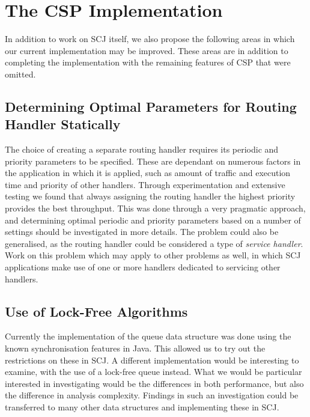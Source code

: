 

\section{The CSP Implementation} %
\label{sec:the_csp_implementation}
In addition to work on SCJ itself, we also propose the following areas in which our current implementation may be improved. These areas are in addition to completing the implementation with the remaining features of CSP that were omitted.

\subsection{Determining Optimal Parameters for Routing Handler Statically} %
\label{sub:determining_optimal_parameters_for_routing_handler_statically}
The choice of creating a separate routing handler requires its periodic and priority parameters to be specified. These are dependant on numerous factors in the application in which it is applied, such as amount of traffic and execution time and priority of other handlers. Through experimentation and extensive testing we found that always assigning the routing handler the highest priority provides the best throughput. This was done through a very pragmatic approach, and determining optimal periodic and priority parameters based on a number of settings should be investigated in more details. The problem could also be generalised, as the routing handler could be considered a type of \textit{service handler}. Work on this problem which may apply to other problems as well, in which SCJ applications make use of one or more handlers dedicated to servicing other handlers.

\subsection{Use of Lock-Free Algorithms} %
\label{sub:lock_free_algorithms}
Currently the implementation of the queue data structure was done using the known synchronisation features in Java. This allowed us to try out the restrictions on these in SCJ. A different implementation would be interesting to examine, with the use of a lock-free queue instead\cite{Valois94implementinglock-free}\cite{Michael:1996:SFP:248052.248106}.
What we would be particular interested in investigating would be the differences in both performance, but also the difference in analysis complexity. Findings in such an investigation could be transferred to many other data structures and implementing these in SCJ.

